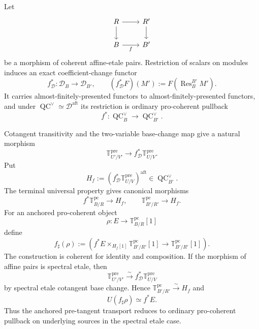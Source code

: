 \begin{construction}
\label{con:bnla-anchored-pre-tangent-transport}
Let
\[
\begin{tikzcd}
R \arrow[r] \arrow[d] & R' \arrow[d]\\
B \arrow[r,"f"'] & B'
\end{tikzcd}
\]
be a morphism of coherent affine-etale pairs.  Restriction of scalars on modules
induces an exact coefficient-change functor
\[
    f_{\mathcal D}^*:\mathcal D_B\longrightarrow\mathcal D_{B'},
    \qquad
    (f_{\mathcal D}^*F)(M'):=F(\operatorname{Res}^{B'}_B M').
\]
It carries almost-finitely-presented functors to
almost-finitely-presented functors, and under
$\operatorname{QC}^{\vee}\simeq\mathcal D^{\mathrm{aft}}$ its restriction is
ordinary pro-coherent pullback
\[
    f^*:\operatorname{QC}^{\vee}_B
    \longrightarrow
    \operatorname{QC}^{\vee}_{B'}.
\]

Cotangent transitivity and the two-variable base-change map give a natural
morphism
\[
    \mathbb T^{\mathrm{pre}}_{U'/V'}
    \longrightarrow
    f_{\mathcal D}^*\mathbb T^{\mathrm{pre}}_{U/V}.
\]
Put
\[
    H_f
    :=
    \left(
        f_{\mathcal D}^*\mathbb T^{\mathrm{pre}}_{U/V}
    \right)^{\mathrm{aft}}
    \in\operatorname{QC}^{\vee}_{B'}.
\]
The terminal universal property gives canonical morphisms
\[
    f^*\mathbb T^{\mathrm{pc}}_{B/R}
    \longrightarrow H_f,
    \qquad
    \mathbb T^{\mathrm{pc}}_{B'/R'}
    \longrightarrow H_f.
\]
For an anchored pro-coherent object
\[
    \rho:E\longrightarrow\mathbb T^{\mathrm{pc}}_{B/R}[1]
\]
define
\[
\boxed{
    f_\sharp(\rho)
    :=
    \left(
        f^*E
        \times_{H_f[1]}
        \mathbb T^{\mathrm{pc}}_{B'/R'}[1]
        \longrightarrow
        \mathbb T^{\mathrm{pc}}_{B'/R'}[1]
    \right).}
\]
The construction is coherent for identity and composition.  If the morphism
of affine pairs is spectral etale, then
\[
    \mathbb T^{\mathrm{pre}}_{U'/V'}
    \xrightarrow{\sim}
    f_{\mathcal D}^*\mathbb T^{\mathrm{pre}}_{U/V}
\]
by spectral etale cotangent base change.  Hence
$\mathbb T^{\mathrm{pc}}_{B'/R'}\xrightarrow{\sim}H_f$ and
\[
\boxed{
    U(f_\sharp\rho)
    \simeq
    f^*E.}
\]
Thus the anchored pre-tangent transport reduces to ordinary pro-coherent
pullback on underlying sources in the spectral etale case.
\end{construction}

